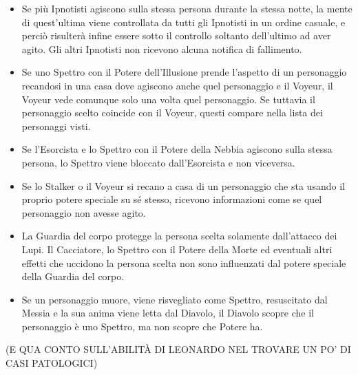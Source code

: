 \documentclass[a4paper,10pt]{article}
\begin{document}
\begin{itemize}
 \item Se più Ipnotisti agiscono sulla stessa persona durante la stessa notte, la mente di quest'ultima viene controllata da tutti gli Ipnotisti in un ordine casuale, e perciò risulterà infine essere sotto il controllo soltanto dell'ultimo ad aver agito. Gli altri Ipnotisti non ricevono alcuna notifica di fallimento.
 
 \item Se uno Spettro con il Potere dell'Illusione prende l'aspetto di un personaggio recandosi in una casa dove agiscono anche quel personaggio e il Voyeur, il Voyeur vede comunque solo una volta quel personaggio. Se tuttavia il personaggio scelto coincide con il Voyeur, questi compare nella lista dei personaggi visti.

 \item Se l'Esorcista e lo Spettro con il Potere della Nebbia agiscono sulla stessa persona, lo Spettro viene bloccato dall'Esorcista e non viceversa.
 
 \item Se lo Stalker o il Voyeur si recano a casa di un personaggio che sta usando il proprio potere speciale su sé stesso, ricevono informazioni come se quel personaggio non avesse agito.
 
 \item La Guardia del corpo protegge la persona scelta solamente dall'attacco dei Lupi. Il Cacciatore, lo Spettro con il Potere della Morte ed eventuali altri effetti che uccidono la persona scelta non sono influenzati dal potere speciale della Guardia del corpo.
 
 \item Se un personaggio muore, viene risvegliato come Spettro, resuscitato dal Messia e la sua anima viene letta dal Diavolo, il Diavolo scopre che il personaggio è uno Spettro, ma non scopre che Potere ha. 
\end{itemize}


(E QUA CONTO SULL'ABILITÀ DI LEONARDO NEL TROVARE UN PO' DI CASI PATOLOGICI)
\end{document}
